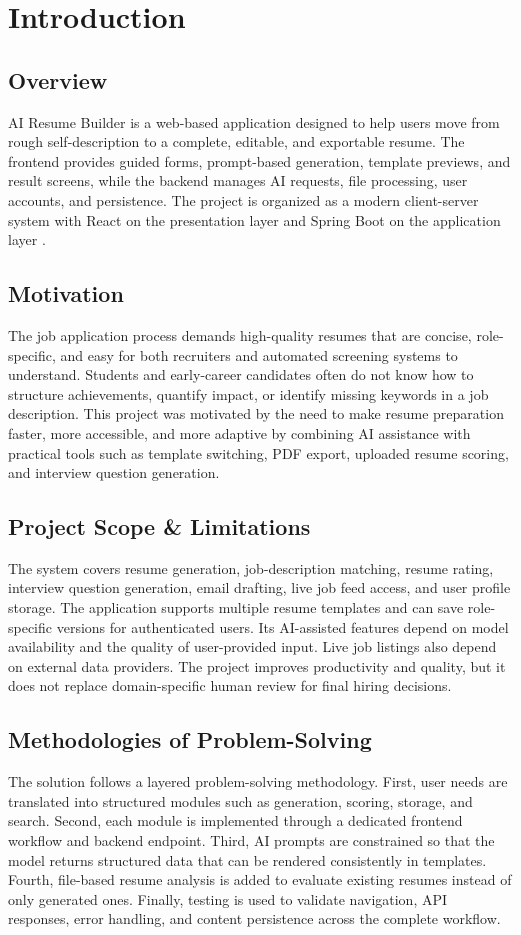 \section{Introduction}
\subsection{Overview}
\noindent AI Resume Builder is a web-based application designed to help users move from rough self-description to a complete, editable, and exportable resume. The frontend provides guided forms, prompt-based generation, template previews, and result screens, while the backend manages AI requests, file processing, user accounts, and persistence. The project is organized as a modern client-server system with React on the presentation layer and Spring Boot on the application layer \cite{react_docs,spring_boot_docs}.

\subsection{Motivation}
\noindent The job application process demands high-quality resumes that are concise, role-specific, and easy for both recruiters and automated screening systems to understand. Students and early-career candidates often do not know how to structure achievements, quantify impact, or identify missing keywords in a job description. This project was motivated by the need to make resume preparation faster, more accessible, and more adaptive by combining AI assistance with practical tools such as template switching, PDF export, uploaded resume scoring, and interview question generation.

\subsection{Project Scope \& Limitations}
\noindent The system covers resume generation, job-description matching, resume rating, interview question generation, email drafting, live job feed access, and user profile storage. The application supports multiple resume templates and can save role-specific versions for authenticated users. Its AI-assisted features depend on model availability and the quality of user-provided input. Live job listings also depend on external data providers. The project improves productivity and quality, but it does not replace domain-specific human review for final hiring decisions.

\subsection{Methodologies of Problem-Solving}
\noindent The solution follows a layered problem-solving methodology. First, user needs are translated into structured modules such as generation, scoring, storage, and search. Second, each module is implemented through a dedicated frontend workflow and backend endpoint. Third, AI prompts are constrained so that the model returns structured data that can be rendered consistently in templates. Fourth, file-based resume analysis is added to evaluate existing resumes instead of only generated ones. Finally, testing is used to validate navigation, API responses, error handling, and content persistence across the complete workflow.
